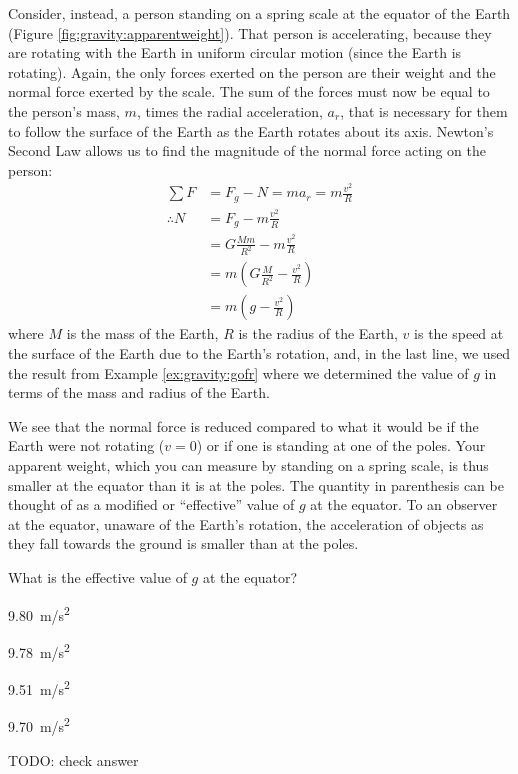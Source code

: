 Consider, instead, a person standing on a spring scale at the equator of the Earth (Figure \ref{fig:gravity:apparentweight}). That person is accelerating, because they are rotating with the Earth in uniform circular motion (since the Earth is rotating). Again, the only forces exerted on the person are their weight and the normal force exerted by the scale. The sum of the forces must now be equal to the person's mass, $m$, times the radial acceleration, $a_r$, that is necessary for them to follow the surface of the Earth as the Earth rotates about its axis. Newton's Second Law allows us to find the magnitude of the normal force acting on the person:
\begin{align*}
\sum F &= F_g-N=ma_r=m\frac{v^2}{R}\\
\therefore N &= F_g - m\frac{v^2}{R}\\
&=G\frac{Mm}{R^2} -  m\frac{v^2}{R}\\
&=m\left(G\frac{M}{R^2} - \frac{v^2}{R}  \right)\\
&=m\left(g - \frac{v^2}{R}  \right)
\end{align*}
where $M$ is the mass of the Earth, $R$ is the radius of the Earth, $v$ is the speed at the surface of the Earth due to the Earth's rotation, and, in the last line, we used the result from Example \ref{ex:gravity:gofr} where we determined the value of $g$ in terms of the mass and radius of the Earth.

We see that the normal force is reduced compared to what it would be if the Earth were not rotating ($v=0$) or if one is standing at one of the poles. Your apparent weight, which you can measure by standing on a spring scale, is thus smaller at the equator than it is at the poles. The quantity in parenthesis can be thought of as a modified or ``effective'' value of $g$ at the equator. To an observer at the equator, unaware of the Earth's rotation, the acceleration of objects as they fall towards the ground is smaller than at the poles. 

\begin{checkpoint}
\begin{MCquestion}{What is the effective value of $g$ at the equator?}
\item \SI{9.80}{m/s^2}
\item \SI{9.78}{m/s^2} \correct
\item \SI{9.51}{m/s^2}
\item \SI{9.70}{m/s^2}
\end{MCquestion}
\end{checkpoint}
TODO: check answer


